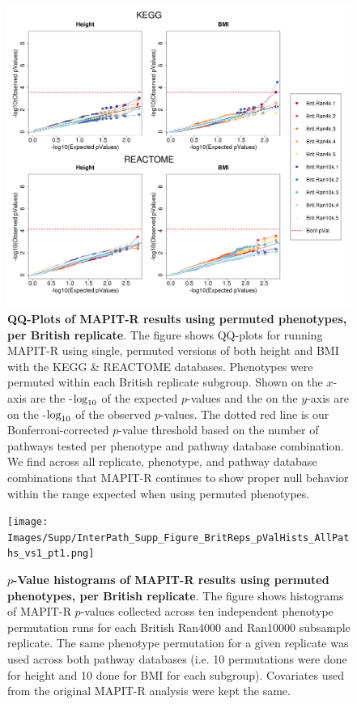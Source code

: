 \documentclass[12pt,a4paper]{article}
\def\log{{\rm log}}
\begin{document}
\begin{figure}[htbp]
\centering
\includegraphics[scale=.35]{Images/Supp/InterPath_Supp_Figure_BritReps_perm1_QQPlots_AllPaths_vs1.png}
\caption[TBD]{\textbf{QQ-Plots of MAPIT-R results using permuted phenotypes, per British replicate}. The figure shows QQ-plots for running MAPIT-R using single, permuted versions of both height and BMI with the KEGG \& REACTOME databases. Phenotypes were permuted within each British replicate subgroup. Shown on the $x$-axis are the -$\log_{10}$ of the expected $p$-values and the on the $y$-axis are on the -$\log_{10}$ of the observed $p$-values. The dotted red line is our Bonferroni-corrected $p$-value threshold based on the number of pathways tested per phenotype and pathway database combination. We find across all replicate, phenotype, and pathway database combinations that MAPIT-R continues to show proper null behavior within the range expected when using permuted phenotypes.}
\label{InterPath-Supp-Figure-BritReps-perm1-QQPlots-AllPaths}
\end{figure}
\clearpage

\setcounter{CharNumber3}{1}
\setlength{\footskip}{1cm}
\begin{figure}[htbp]
\centering
\vspace*{-1cm}
\texttt{[image: Images/Supp/InterPath\_Supp\_Figure\_BritReps\_pValHists\_AllPaths\_vs1\_pt1.png]}
\caption[TBD]{\textbf{$p$-Value histograms of MAPIT-R results using permuted phenotypes, per British replicate}. The figure shows histograms of MAPIT-R $p$-values collected across ten independent phenotype permutation runs for each British Ran4000 and Ran10000 subsample replicate. The same phenotype permutation for a given replicate was used across both pathway databases (i.e. 10 permutations were done for height and 10 done for BMI for each subgroup). Covariates used from the original MAPIT-R analysis were kept the same.}
\label{InterPath-Supp-Figure-BritReps-10perms-pValHists-pt1}
\end{figure}
\clearpage
\setlength{\footskip}{1cm}
\addtocounter{figure}{-1}
\addtocounter{CharNumber3}{1}
\end{document}
